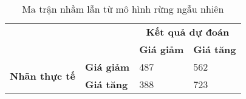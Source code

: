\narrowlinespacing

\begin{table}[H] 
    \centering

    \begin{tabularx}{0.7\textwidth}{
    p{}%
    p{}%
    p{}
    p{}
    }
        
        \toprule\midrule
        \textbf{} & \textbf{} & \multicolumn{2}{c}{\textbf{Kết quả dự đoán}} \\
        \cmidrule(rl){3-4}
        \textbf{} & \textbf{} & \textbf{Giá giảm} & \textbf{Giá tăng} \\
        \midrule
        
        
        \multirow{2}{*}{\textbf{Nhãn thực tế }}  & \textbf{Giá giảm} & 487 & 562\\
        & \textbf{Giá tăng} & 388 & 723 \\
        
        \midrule
        \bottomrule
        
    \end{tabularx}
    \label{tab:rf_confusion_matrix}
    \caption{Ma trận nhầm lẫn từ mô hình rừng ngẫu nhiên}
\end{table}

\normallinespacing
